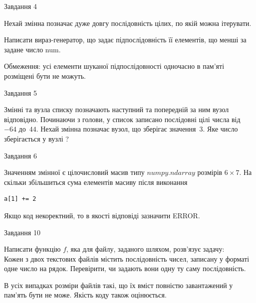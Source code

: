 \documentclass[12pt, ukrainian]{article}
\begin{document}
{               
{\begin{center}Завдання {4}\end{center}}
\vspace{-6mm}
Нехай змінна  позначає дуже довгу послідовність цілих, по якій можна ітерувати.

Написати вираз-генератор, що задає підпослідовність її елементів, що менші за задане число num.

Обмеження: усі елементи шуканої підпослідовності одночасно в пам'яті розміщені бути не можуть.\par

\vspace{10mm}
               
{\begin{center}Завдання {5}\end{center}}
\vspace{-6mm}
Змінні  та  вузла списку позначають наступний та попередній за ним вузол відповідно. Починаючи з голови, у список записано послідовні цілі числа від~$-64$ до~$44$. Нехай змінна  позначає вузол, що зберігає значення~$3$.
Яке число зберігається у вузлі  ?\par

               
{\begin{center}Завдання {6}\end{center}}
\vspace{-6mm}
Значенням змінної  є цілочисловий масив типу $numpy.ndarray$ розмірів $6{\times}7$. На скільки збільшиться сума елементів масиву  після виконання
\begin{verbatim}
a[1] += 2
\end{verbatim}


Якщо код некоректний, то в якості відповіді зазначити ERROR.\par

               
{\begin{center}Завдання {10}\end{center}}
\vspace{-6mm}

Написати функцію $f$, яка для файлу, заданого шляхом, розв’язує задачу:\\ Кожен з двох текстових файлів містить послідовність чисел, записану у форматі одне число на рядок.  Перевірити, чи задають вони одну ту саму послідовність.

В усіх випадках розміри файлів такі, що їх вміст повністю завантажений у пам'ять бути не може. Якість коду також оцінюється.



}
\end{document}
